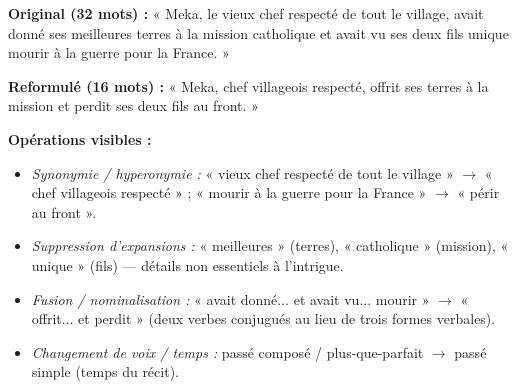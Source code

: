 \documentclass[11pt]{article}
\begin{document}
\begin{exemplebox}
\textbf{Original (32 mots) :} « Meka, le vieux chef respecté de tout le village, avait donné ses meilleures terres à la mission catholique et avait vu ses deux fils unique mourir à la guerre pour la France. »

\textbf{Reformulé (16 mots) :} « Meka, chef villageois respecté, offrit ses terres à la mission et perdit ses deux fils au front. »

\textbf{Opérations visibles :}
\begin{itemize}
    \item \emph{Synonymie / hyperonymie :} « vieux chef respecté de tout le village » $\to$ « chef villageois respecté » ; « mourir à la guerre pour la France » $\to$ « périr au front ».
    \item \emph{Suppression d'expansions :} « meilleures » (terres), « catholique » (mission), « unique » (fils) — détails non essentiels à l'intrigue.
    \item \emph{Fusion / nominalisation :} « avait donné... et avait vu... mourir » $\to$ « offrit... et perdit » (deux verbes conjugués au lieu de trois formes verbales).
    \item \emph{Changement de voix / temps :} passé composé / plus-que-parfait $\to$ passé simple (temps du récit).
\end{itemize}
\end{exemplebox}
\end{document}
